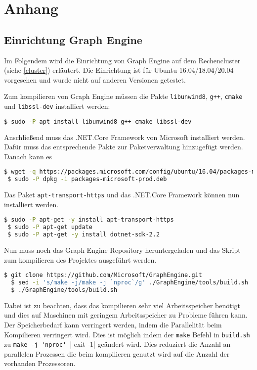 \chapter{Anhang}
\label{anhang} 

\section{Einrichtung Graph Engine}
\label{geSetup}

Im Folgendem wird die Einrichtung von Graph Engine auf dem Rechencluster (siehe \ref{cluster}) erläutert.
Die Einrichtung ist für Ubuntu 16.04/18.04/20.04 vorgesehen und wurde nicht auf anderen Versionen getestet.

Zum kompilieren von Graph Engine müssen die Pakte \verb|libunwind8|, \verb|g++|,  \verb|cmake| und \verb|libssl-dev| installiert werden:

\begin{lstlisting}[language=bash]
  $ sudo -P apt install libunwind8 g++ cmake libssl-dev
\end{lstlisting}

Anschließend muss das .NET.Core Framework von Microsoft installiert werden. Dafür muss das entsprechende Pakte zur Paketverwaltung hinzugefügt werden.
Danach kann es 

\begin{lstlisting}[language=bash]
 $ wget -q https://packages.microsoft.com/config/ubuntu/16.04/packages-microsoft-prod.deb
 $ sudo -P dpkg -i packages-microsoft-prod.deb
\end{lstlisting}

Das Paket \verb|apt-transport-https| und das .NET.Core Framework können nun installiert werden.

\begin{lstlisting}[language=bash]
 $ sudo -P apt-get -y install apt-transport-https
 $ sudo -P apt-get update
 $ sudo -P apt-get -y install dotnet-sdk-2.2
\end{lstlisting}

Nun muss noch das Graph Engine Repository heruntergeladen und das Skript zum kompilieren des Projektes ausgeführt werden.

\begin{lstlisting}[language=bash]
  $ git clone https://github.com/Microsoft/GraphEngine.git
  $ sed -i 's/make -j/make -j `nproc`/g' ./GraphEngine/tools/build.sh
  $ ./GraphEngine/tools/build.sh
 \end{lstlisting}

Dabei ist zu beachten, dass das kompilieren sehr viel Arbeitsspeicher benötigt und dies auf Maschinen mit geringem Arbeitsspeicher zu Probleme führen kann.
Der Speicherbedarf kann verringert werden, indem die Parallelität beim Kompilieren verringert wird. Dies ist möglich indem der \verb|make| Befehl in \verb|build.sh| zu \verb|make -j 'nproc' || exit -1| geändert wird.
Dies reduziert die Anzahl an parallelen Prozessen die beim kompilieren genutzt wird auf die Anzahl der vorhanden Prozessoren. 


